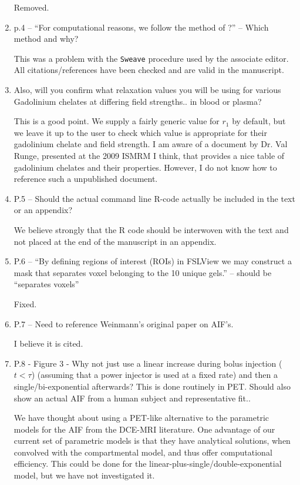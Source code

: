 \documentclass[11pt]{article}
\begin{document}
\begin{enumerate}
  Removed.

\item p.4 – ``For computational reasons, we follow the method of ?'' –
  Which method and why?

  This was a problem with the \texttt{Sweave} procedure used by the
  associate editor.  All citations/references have been checked and
  are valid in the manuscript.

\item Also, will you confirm what relaxation values you will be using
  for various Gadolinium chelates at differing field strengths.. in
  blood or plasma?

  This is a good point.  We supply a fairly generic value for $r_1$ by
  default, but we leave it up to the user to check which value is
  appropriate for their gadolinium chelate and field strength.  I am
  aware of a document by Dr. Val Runge, presented at the 2009 ISMRM I
  think, that provides a nice table of gadolinium chelates and their
  properties.  However, I do not know how to reference such a
  unpublished document.

\item P.5 – Should the actual command line R-code actually be included
  in the text or an appendix?

  We believe strongly that the \textsf{R} code should be interwoven
  with the text and not placed at the end of the manuscript in an
  appendix.

\item P.6 – ``By defining regions of interest (ROIs) in FSLView we may
  construct a mask that separates voxel belonging to the 10 unique
  gels.'' – should be ``separates voxels''

  Fixed.

\item P.7 – Need to reference Weinmann’s original paper on AIF's.

  I believe it is cited.

\item P.8 - Figure 3 - Why not just use a linear increase during bolus
  injection ($t<\tau$) (assuming that a power injector is used at a
  fixed rate) and then a single/bi-exponential afterwards?  This is
  done routinely in PET.  Should also show an actual AIF from a human
  subject and representative fit..

  We have thought about using a PET-like alternative to the parametric
  models for the AIF from the DCE-MRI literature.  One advantage of
  our current set of parametric models is that they have analytical
  solutions, when convolved with the compartmental model, and thus
  offer computational efficiency.  This could be done for the
  linear-plus-single/double-exponential model, but we have not
  investigated it.


\end{enumerate}
\end{document}
